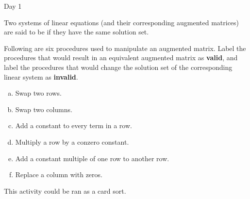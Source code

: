 \begin{applicationActivities}{Day 1}
\begin{definition}
  Two systems of linear equations (and their corresponding augmented
  matrices) are said to be  if they have the same
  solution set.
\end{definition}

\begin{activity}{10}
  Following are six procedures used to manipulate an augmented matrix.
  Label the procedures that would result in an equivalent augmented
  matrix as \textbf{valid}, and label the procedures that would
  change the solution set of the corresponding linear system as
  \textbf{invalid}.
  \begin{multicols}{2}
    \begin{enumerate}[a)]
      \item Swap two rows.
      \item Swap two columns.
      \item Add a constant to every term in a row.
      \item Multiply a row by a conzero constant.
      \item Add a constant multiple of one row to another row.
      \item Replace a column with zeros.
    \end{enumerate}
  \end{multicols}
  \begin{TBLnote}
    This activity could be ran as a card sort.
  \end{TBLnote}
\end{activity}




\end{applicationActivities}
